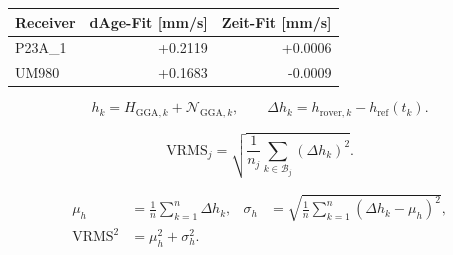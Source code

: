 \documentclass[11pt,a4paper]{article}
\numberwithin{equation}{section}
\numberwithin{figure}{section}
\begin{document}
\begin{center}\begin{lrbox}{\reporttable}\small\setlength{\tabcolsep}{4pt}\begin{tabular}{lrr}\toprule
Receiver & dAge-Fit [mm/\allowbreak{}s] & Zeit-Fit [mm/\allowbreak{}s]\\\midrule
P23A\_1 & +0.2119 & +0.0006\\
UM980 & +0.1683 & -0.0009\\
\bottomrule\end{tabular}\end{lrbox}\ifdim\wd\reporttable>\linewidth\resizebox{\linewidth}{!}{\usebox{\reporttable}}\else\usebox{\reporttable}\fi\end{center}

\begin{equation}h_k=H_{\mathrm{GGA},k}+\mathcal N_{\mathrm{GGA},k},\qquad \Delta h_k=h_{\mathrm{rover},k}-h_{\mathrm{ref}}(t_k).\label{eq:de-height}\end{equation}

\begin{equation}\mathrm{VRMS}_j=\sqrt{\frac{1}{n_j}\sum_{k\in\mathcal B_j}(\Delta h_k)^2}.\label{eq:de-vrms}\end{equation}

\begin{equation}\begin{aligned}\mu_h&=\frac{1}{n}\sum_{k=1}^{n}\Delta h_k,& \sigma_h&=\sqrt{\frac{1}{n}\sum_{k=1}^{n}(\Delta h_k-\mu_h)^2},\\ \mathrm{VRMS}^2&=\mu_h^2+\sigma_h^2.\end{aligned}\label{eq:de-bias}\end{equation}
\end{document}
